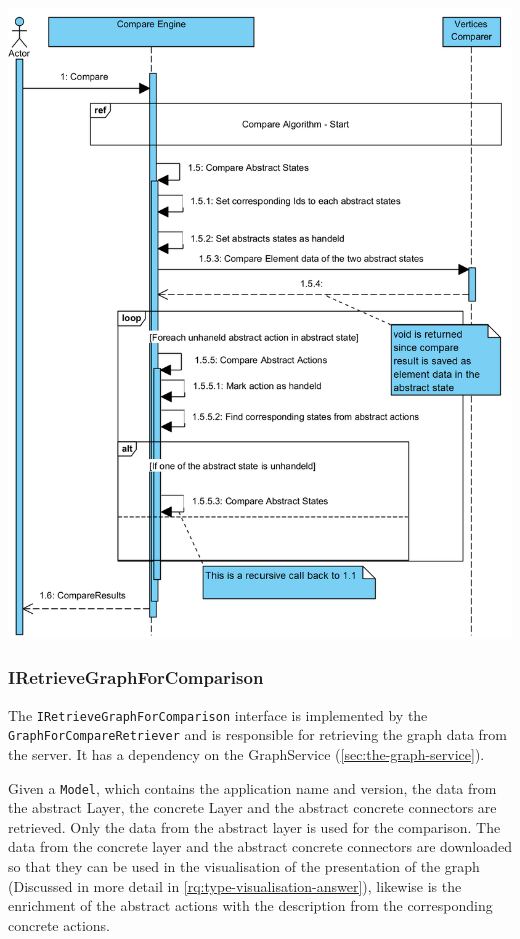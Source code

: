 \begingroup
\captionsetup{type=figure}
\includegraphics[scale=0.9]{content/5-Results/Images/Compare-algorithm-compare.png}
\label{fig:compare-algorithm-compare}
\endgroup

\subsubsection{IRetrieveGraphForComparison}
The \verb|IRetrieveGraphForComparison| interface is implemented by the \verb|GraphForCompareRetriever| and is responsible for retrieving the graph data from the server. It has a dependency on the GraphService (\ref{sec:the-graph-service}). 

Given a \verb|Model|, which contains the application name and version, the data from the abstract Layer, the concrete Layer and the abstract concrete connectors are retrieved. Only the data from the abstract layer is used for the comparison. The data from the concrete layer and the abstract concrete connectors are downloaded so that they can be used in the visualisation of the presentation of the graph (Discussed in more detail in \ref{rq:type-visualisation-answer}), likewise is the enrichment of the abstract actions with the description from the corresponding concrete actions.


